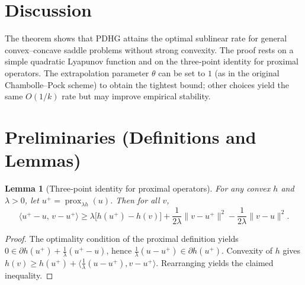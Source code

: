 \documentclass{article}
\newtheorem{lemma}{Lemma}
\newcommand{\prox}{\operatorname{prox}}
\begin{document}
\section*{Discussion}
The theorem shows that PDHG attains the optimal sublinear rate for
general convex–concave saddle problems without strong convexity.
The proof rests on a simple quadratic Lyapunov function and on the
three‑point identity for proximal operators. The extrapolation parameter
$\theta$ can be set to $1$ (as in the original Chambolle–Pock scheme) to
obtain the tightest bound; other choices yield the same $O(1/k)$ rate
but may improve empirical stability.

\newpage
\section*{Preliminaries (Definitions and Lemmas)}
\begin{lemma}[Three‑point identity for proximal operators]\label{lem:prox}
For any convex $h$ and $\lambda>0$, let $u^{+}=\prox_{\lambda h}(u)$. Then for all $v$,
\[
\langle u^{+}-u,\,v-u^{+}\rangle
\ge \lambda\bigl[h(u^{+})-h(v)\bigr]
+\frac{1}{2\lambda}\|v-u^{+}\|^{2}
-\frac{1}{2\lambda}\|v-u\|^{2}.
\]
\end{lemma}
\begin{proof}
The optimality condition of the proximal definition yields
$0\in\partial h(u^{+})+\frac{1}{\lambda}(u^{+}-u)$,
hence $\frac{1}{\lambda}(u-u^{+})\in\partial h(u^{+})$.
Convexity of $h$ gives
$h(v)\ge h(u^{+})+\langle \frac{1}{\lambda}(u-u^{+}),v-u^{+}\rangle$.
Rearranging yields the claimed inequality. \qedhere
\end{proof}
\end{document}
